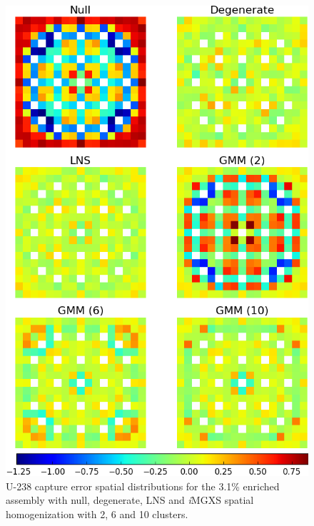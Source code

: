 \begin{figure}[h!]
\centering
\includegraphics[width=0.9\linewidth]{figures/results/spatial/assm-31/capt-err}
\vspace{2mm}
\caption[U-238 capture errors for the 3.1\% enriched assembly]{U-238 capture error spatial distributions for the 3.1\% enriched assembly with null, degenerate, \ac{LNS} and \textit{i}\ac{MGXS} spatial homogenization with 2, 6 and 10 clusters.}
\label{fig:chap11-assm-3.1-capt-err}
\end{figure}

\clearpage

